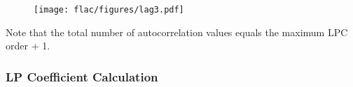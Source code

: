\begin{figure}[h]
\texttt{[image: flac/figures/lag3.pdf]}
\end{figure}
\par
\noindent
Note that the total number of autocorrelation values equals
the maximum LPC order + 1.

\clearpage

\subsubsection{LP Coefficient Calculation}
\label{flac:compute_lp_coeffs}


\clearpage

